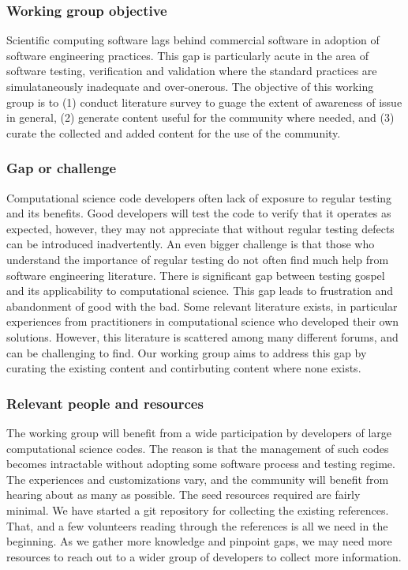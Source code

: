 \subsubsection{Working group objective}
Scientific computing software lags behind commercial software in
adoption of software engineering practices. This
gap is particularly acute in the area of software testing,
verification and validation where the standard practices are
simulataneously inadequate and over-onerous. The objective of this
working group is to (1) conduct literature survey to guage the extent
of awareness of issue in general, (2) generate content useful for
the community where needed, and (3) curate the collected and added
content for the use of the community.

\subsubsection{Gap or challenge}
Computational science code developers often lack of exposure to
regular testing and its benefits. Good developers will test the code to
verify that it operates as expected, however, they may not appreciate
that without regular testing defects can be introduced
inadvertently. An even bigger challenge is that those who understand
the importance of regular testing do not often find much help from
software engineering literature. There is significant gap between
testing gospel and its applicability to computational science. This
gap leads to frustration and abandonment of good with the bad. Some
relevant literature exists, in particular experiences from
practitioners in computational science who developed their own
solutions. However, this literature is scattered among many different
forums, and can be challenging to find. Our working group aims to
address this gap by curating the existing content and contirbuting
content where none exists.

\subsubsection{Relevant people and resources}

The working group will benefit from a wide participation by developers
of large computational science codes. The reason is that the
management of such codes becomes intractable without adopting some
software process and testing regime. The experiences and
customizations vary, and the community will benefit from hearing about
as many as possible. The seed resources required are fairly
minimal. We have started a git repository for collecting the
existing references. That, and a few volunteers reading through the
references is all we need in the beginning. As we gather more
knowledge and pinpoint gaps, we may need more resources to reach out
to a wider group of developers to collect more information.

